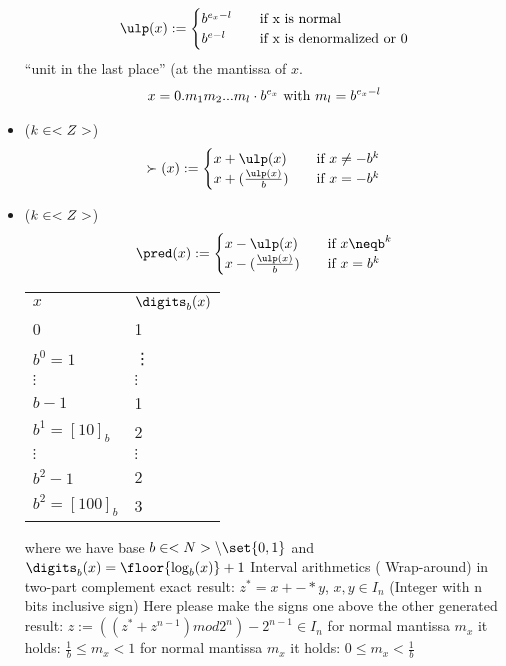 \begin{itemize}
  \begin{align*}
    \ulp(x) := \begin{cases}
    	b^{e_x-l} &\quad\text{if x is normal}\\
    	b^{e-l} &\quad\text{if x is denormalized or }0
    \end{cases}
  \end{align*} 
 ``unit in the last place'' (at the mantissa of $x$. 
  \begin{align*}
  	x=0.m_1 m_2...m_l\cdot b^{e_x} \text{ with } m_l = b^{e_x - l}
  \end{align*}
  \item {} ($k \in <Z>$)
  \begin{align*}
  	\succ(x) := \begin{cases}
  		x+\ulp(x) &\quad \text{if } x\neq -b^k\\
  		x+(\frac{\ulp(x)}{b}) &\quad \text{if } x=-b^k
  	\end{cases}
  \end{align*}
  \item {} ($k\in <Z>$)
  \begin{align*}
  	\pred(x) := \begin{cases}
  		x-\ulp(x)& \quad\text{if } x\neqb^k\\
  		x-(\frac{\ulp(x)}{b})& \quad\text{if } x=b^k	
  	\end{cases}
  \end{align*}
  \begin{tabularx}{\textwidth}{|X|X|}
  	\hline
  	\textbf{$x$}   & $\digits_b(x)$\\
  	0 & 1\\
  	$b^0 = 1$ & \vdots \\
  	$\vdots$ & $\vdots$ \\
  	$b-1$ & 1\\
  	$b^1 = [10]_b$ & 2\\
  	$\vdots$ & $\vdots$\\
  	$b^2 -1$ & 2\\
  	$b^2 = [100]_b$ & 3
  	\hline
  \end{tabularx}
	where we have base $b \in \N\setminus \set{0,1}$ and $\digits_b(x) = \floor{ \log_b(x)} +1$
\newline Interval arithmetics ( Wrap-around) \from in two-part complement
\newline exact result: $z^*=x+-* y$, $x,y\in I_n$ (Integer with n bits inclusive sign)
\newline Here please make the signs one above the other
\newline generated result: $z:=((z^*+z^{n-1})mod2^n)-2^{n-1}\in I_n$
\newline for normal mantissa $m_x$ it holds: $\frac{1}{b}\leqslant m_x<1$
\newline for normal mantissa $m_x$ it holds: $0\leqslant m_x<\frac{1}{b}$ \smallskip


\end{itemize}
